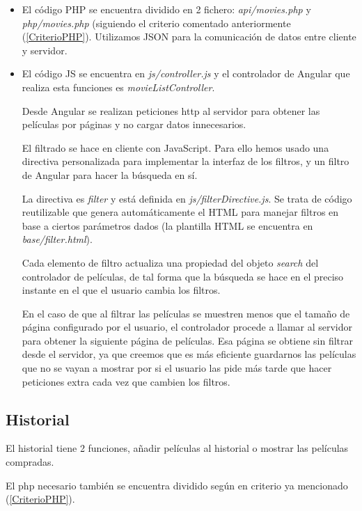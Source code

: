 \documentclass{apuntes}
\begin{document}
\begin{itemize}
\item El código PHP se encuentra dividido en 2 fichero: \textit{api/movies.php} y \textit{php/movies.php} (siguiendo el criterio comentado anteriormente (\ref{CriterioPHP}). Utilizamos JSON para la comunicación de datos entre cliente y servidor.

\item El código JS se encuentra en \textit{js/controller.js} y el controlador de Angular que realiza esta funciones es \textit{movieListController}.

Desde Angular se realizan peticiones http al servidor para obtener las películas por páginas y no cargar datos innecesarios.

El filtrado se hace en cliente con JavaScript. Para ello hemos usado una directiva personalizada para implementar la interfaz de los filtros, y un filtro de Angular para hacer la búsqueda en sí.

La directiva es \textit{filter} y está definida en \textit{js/filterDirective.js}. Se trata de código reutilizable que genera automáticamente el HTML para manejar filtros en base a ciertos parámetros dados (la plantilla HTML se encuentra en \textit{base/filter.html}).

Cada elemento de filtro actualiza una propiedad del objeto \textit{search} del controlador de películas, de tal forma que la búsqueda se hace en el preciso instante en el que el usuario cambia los filtros.

En el caso de que al filtrar las películas se muestren menos que el tamaño de página configurado por el usuario, el controlador procede a llamar al servidor para obtener la siguiente página de películas. Esa página se obtiene sin filtrar desde el servidor, ya que creemos que es más eficiente guardarnos las películas que no se vayan a mostrar por si el usuario las pide más tarde que hacer peticiones extra cada vez que cambien los filtros.
\end{itemize}



\subsection{Historial}

El historial tiene 2 funciones, añadir películas al historial o mostrar las películas compradas. 

El php necesario también se encuentra dividido según en criterio ya mencionado (\ref{CriterioPHP}).
\end{document}

